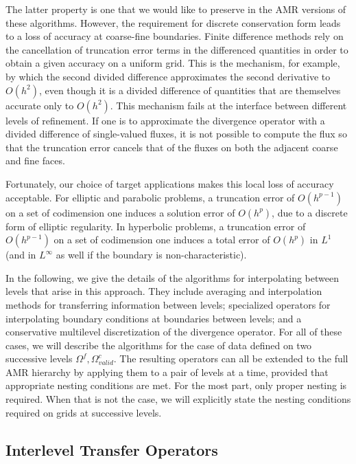 The latter 
property is one that we would like to preserve in the AMR versions of
these algorithms.  However, the requirement for discrete conservation form
leads to a loss of accuracy at coarse-fine boundaries.  Finite
difference methods rely on the cancellation of truncation error terms
in the differenced quantities in order to obtain a given accuracy on a
uniform grid.  This
is the mechanism, for example, by which the second divided difference
approximates the second derivative to $O(h^2)$, even though it is a
divided difference of quantities that are themselves accurate only to
$O(h^2)$.  This mechanism fails at the interface between different
levels of refinement.  If one is to approximate the divergence
operator with a divided difference of single-valued fluxes, it is not
possible to compute the flux so that the truncation error cancels that
of the fluxes on both the adjacent coarse and fine faces.

Fortunately, our choice of target applications makes this local loss
of accuracy acceptable.  For elliptic and parabolic problems, a
truncation error of $O(h^{p-1})$ on a set of codimension one induces a
solution error of $O(h^p)$, due to a discrete form of elliptic
regularity.  In hyperbolic problems, a truncation error
of $O(h^{p-1})$ on a set of codimension one induces a total error of
$O(h^p)$ in $L^1$ (and in $L^\infty$ as well if the boundary is
non-characteristic).

In the following, we give the details of the algorithms for 
interpolating between levels that arise in this approach. They include
averaging and interpolation methods for transferring information between
levels; specialized operators for interpolating boundary conditions at
boundaries between levels; and a conservative multilevel discretization 
of the divergence operator. For all of these cases, we will describe the
algorithms for the case of data defined on two successive levels 
$\Omega^f,\Omega^c_{valid}$. The resulting operators can all be extended
to the full AMR hierarchy by applying them to a pair of levels at a
time, provided that appropriate nesting conditions are met. For the
most part, only proper nesting is required. When that is not the case,
we will explicitly state the nesting conditions required on grids at
successive levels.

\subsection{Interlevel Transfer Operators \label{sec:ilt}}


